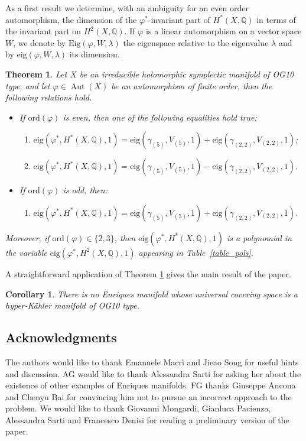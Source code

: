 \documentclass[a4paper,11pt]{amsart}
\makeatletter
\newcommand{\skipitems}[1]{%
  \addtocounter{\@enumctr}{#1}%
}
\newcommand{\eig}{{\mathrm{eig}}}
\newcommand{\Eig}{{\mathrm{Eig}}}
\newcommand{\V}[2]{V_{(#1,#2)}}
\newcommand{\Ver}{V_{(5)}}
\newcommand{\Aut}{\operatorname{Aut}}
\newcommand{\ord}{{\mathrm{ord}}}
\theoremstyle{plain}
\newtheorem{theorem}[satz]{Theorem}
\newtheorem{corollary}[satz]{Corollary}
\theoremstyle{remark}
\makeatother
\begin{document}
As a first result we determine, with an ambiguity for an even order automorphism, the dimension of the $\varphi^*$-invariant part of $H^*(X,\mathbb Q)$ in terms of the invariant part on $H^2(X,\mathbb Q)$.
If $\varphi$ is a linear automorphism  on a vector space $W$, we denote by $\Eig(\varphi, W, \lambda)$ the eigenspace relative to the eigenvalue $\lambda$ and by $\eig(\varphi, W, \lambda)$ its dimension. 
\begin{theorem}\label{MainThm}
Let \(X\) be an irreducible holomorphic symplectic manifold of OG10 type, and let \(\varphi \in \Aut(X)\) be an automorphism of finite order, then the following 
relations hold.
\begin{itemize}
    \item If \(\ord(\varphi)\) is even, then one of the following equalities hold true:

\begin{enumerate}[label=\alph*)]
  \item \(\eig(\varphi^*, H^*(X, \mathbb{Q}), 1) = \eig(\gamma_{(5)},\Ver, 1) + \eig(\gamma_{(2,2)}, \V22, 1)\);
 \item \(\eig(\varphi^*, H^*(X, \mathbb{Q}), 1) = \eig(\gamma_{(5)}, \Ver, 1) - \eig(\gamma_{(2,2)}, \V22, 1)\).
    \end{enumerate}

\item If \(\ord(\varphi)\) is odd, then:

 \begin{enumerate}[label=\alph*)]
         \skipitems{2}
        \item \(\eig(\varphi^*, H^*(X, \mathbb{Q}), 1) = \eig(\gamma_{(5)}, \Ver, 1) + \eig(\gamma_{(2,2)}, \V22, 1)\).
    \end{enumerate}
\end{itemize}
Moreover, if $\ord (\varphi)\in \{2,3\}$, then \(\eig(\varphi^*, H^*(X, \mathbb{Q}), 1)\) is a polynomial in the variable $\eig(\varphi^*, H^2(X, \mathbb{Q}), 1)$ appearing in Table~\ref{table_pols}.

\end{theorem}
A straightforward application of Theorem \ref{MainThm} gives the main result of the paper.
\begin{corollary}\label{cor:no-Enriques}
    There is no Enriques manifold whose universal covering space is a hyper-Kähler manifold of OG10 type.
\end{corollary}


\subsection*{Acknowledgments}
 The authors would like to thank Emanuele Macrì and Jieao Song for useful hints and discussion. AG would like to thank Alessandra Sarti for asking her about the existence of other examples of Enriques manifolds. FG thanks Giuseppe Ancona and Chenyu Bai for convincing him not to pursue an incorrect approach to the problem.
 We would like to thank Giovanni Mongardi, Gianluca Pacienza, Alessandra Sarti and Francesco Denisi for reading a preliminary version of the paper.
\end{document}
